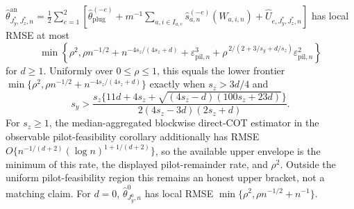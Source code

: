 \(\widehat\theta^{\mathrm{an}}_{J_y^*,J_z^*,n}=\frac12\sum_{e=1}^2[\widehat\theta_{\mathrm{plug}}^{(-e)}+m^{-1}\sum_{a,i\in I_{a,e}}\widehat s_{a,n}^{(-e)}(W_{a,i,n})+\widehat U_{e,J_y^*,J_z^*,n}]\) has local RMSE at most
\[
\min\!\left\{\rho^2,\rho n^{-1/2}+n^{-4s_z/(4s_z+d)}+\varepsilon_{\mathrm{pil},n}^3+\rho^{\,2/(2+3/s_y+d/s_z)}\varepsilon_{\mathrm{pil},n}^2\right\}
\]
for \(d\ge1\).  Uniformly over \(0\le\rho\le1\), this equals the lower frontier \(\min\{\rho^2,\rho n^{-1/2}+n^{-4s_z/(4s_z+d)}\}\) exactly when \(s_z>3d/4\) and
\[
s_y>\frac{s_z\{11d+4s_z+\sqrt{(4s_z-d)(100s_z+23d)}\}}{2(4s_z-3d)(2s_z+d)}.
\]
For \(s_z\ge1\), the median-aggregated blockwise direct-COT estimator in the observable pilot-feasibility corollary additionally has RMSE \(O\{n^{-1/(d+2)}(\log n)^{1+1/(d+2)}\}\), so the available upper envelope is the minimum of this rate, the displayed pilot-remainder rate, and \(\rho^2\).  Outside the uniform pilot-feasibility region this remains an honest upper bracket, not a matching claim.  For \(d=0\), \(\widehat\theta^0_{J_y^0,n}\) has local RMSE \(\min\{\rho^2,\rho n^{-1/2}+n^{-1}\}\).